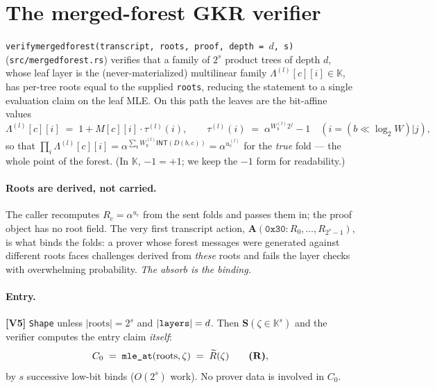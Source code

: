 \documentclass[11pt]{article}
\newcommand{\K}{\mathbb{K}}            %
\newcommand{\INT}{\mathsf{INT}}
\newcommand{\mle}[1]{\widetilde{#1}}
\newcommand{\code}[1]{{\def\_{\textunderscore\allowbreak}\texttt{#1}}}
\newcommand{\Vc}[1]{\textbf{[V#1]}}    %
\begin{document}
\section{The merged-forest GKR verifier}
\label{sec:forest}

\code{verify\_merged\_forest(transcript, roots, proof, depth = $d$, s)}
(\code{src/merged\_forest.rs}) verifies that a family of $2^s$ product
trees of depth $d$, whose leaf layer is the (never-materialized)
multilinear family
$\Lambda^{(l)}[c][i] \in \K$, has per-tree roots equal to the supplied
\code{roots}, reducing the statement to a single evaluation claim on the
leaf MLE.  On this path the leaves are the bit-affine values
\begin{equation}\label{eq:leaves}
  \Lambda^{(l)}[c][i] \;=\; 1 + M[c][i]\cdot \tau^{(l)}(i),
  \qquad
  \tau^{(l)}(i) \;=\; \alpha^{W^{(l)}_b 2^j} - 1
  \quad (i = (b \ll \log_2 W)|j),
\end{equation}
so that $\prod_i \Lambda^{(l)}[c][i] = \alpha^{\sum_b W^{(l)}_b
\INT(D(b,c))} = \alpha^{u^{(l)}_c}$ for the \emph{true} fold — the whole
point of the forest.  (In $\K$, $-1 = +1$; we keep the $-1$ form for
readability.)

\paragraph{Roots are derived, not carried.}  The caller recomputes
$R_c = \alpha^{u_c}$ from the sent folds and passes them in; the proof
object has no root field.  The very first transcript action,
$\mathbf{A}(\mathtt{0x30}\!:\!R_0,\dots,R_{2^s-1})$, is what binds the
folds: a prover whose forest messages were generated against different
roots faces challenges derived from \emph{these} roots and fails the layer
checks with overwhelming probability.  \emph{The absorb is the binding.}

\paragraph{Entry.}  \Vc{5} \code{Shape} unless $|\mathrm{roots}| = 2^s$
and $|\code{layers}| = d$.  Then $\mathbf{S}(\zeta \in \K^s)$ and the
verifier computes the entry claim \emph{itself}:
\[
  C_0 \;=\; \code{mle\_at}(\mathrm{roots}, \zeta) \;=\; \mle{R}(\zeta)
  \qquad \textbf{(R)},
\]
by $s$ successive low-bit binds ($O(2^s)$ work).  No prover data is
involved in $C_0$.
\end{document}
